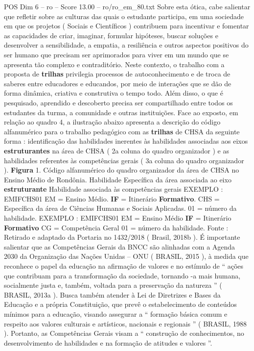 \begin{textsample}{POS Dim 6 – ro – Score 13.00 – ro/ro\_em\_80.txt}
Sobre esta ótica, cabe salientar que refletir sobre as culturas das quais o estudante participa, em uma sociedade em que os projetos ( Sociais e Científicos ) contribuem para incentivar e fomentar as capacidades de criar, imaginar, formular hipóteses, buscar soluções e desenvolver a sensibilidade, a empatia, a resiliência e outros aspectos positivos do ser humano que precisam ser aprimorados para viver em um mundo que se apresenta tão complexo e contraditório.
Neste contexto, o trabalho com a proposta de \textbf{trilhas} privilegia processos de autoconhecimento e de troca de saberes entre educadores e educandos, por meio de interações que se dão de forma dinâmica, criativa e construtiva o tempo todo.
Além disso, o que é pesquisado, aprendido e descoberto precisa ser compartilhado entre todos os estudantes da turma, a comunidade e outras instituições.
Face ao exposto, em relação ao quadro 4, a ilustração abaixo apresenta a descrição do código alfanumérico para o trabalho pedagógico com as \textbf{trilhas} de CHSA da seguinte forma : identificação das habilidades inerentes às habilidades associadas aos eixos \textbf{estruturantes} na área de CHSA ( 2a coluna do quadro organizador ) e as habilidades referentes às competências gerais ( 3a coluna do quadro organizador ). \textbf{Figura} 1.
Código alfanumérico do quadro organizador da área de CHSA no Ensino Médio de Rondônia.
Habilidade Específica da área associada ao eixo \textbf{estruturante} Habilidade associada às competências gerais EXEMPLO : EMIFCHS01 EM = Ensino Médio. \textbf{IF} = Itinerário \textbf{Formativo}.
CHS = Específica da área de Ciências Humanas e Sociais Aplicadas. 01 = número da habilidade.
EXEMPLO : EMIFCHS01 EM = Ensino Médio \textbf{IF} = Itinerário \textbf{Formativo} CG = Competência Geral 01 = número da habilidade.
Fonte : Retirado e adaptado da Portaria no 1432/2018 ( Brasil, 2018b ).
É importante salientar que as Competências Gerais da BNCC são alinhadas com a Agenda 2030 da Organização das Nações Unidas – ONU ( BRASIL, 2015 ), à medida que reconhece o papel da educação na afirmação de valores e no estímulo de “ ações que contribuam para a transformação da sociedade, tornando -a mais humana, socialmente justa e, também, voltada para a preservação da natureza ” ( BRASIL, 2013a ).
Busca também atender à Lei de Diretrizes e Bases da Educação e a própria Constituição, que prevê o estabelecimento de conteúdos mínimos para a educação, visando assegurar a “ formação básica comum e respeito aos valores culturais e artísticos, nacionais e regionais ” ( BRASIL, 1988 ).
Portanto, as Competências Gerais visam a “ construção de conhecimentos, no desenvolvimento de habilidades e na formação de atitudes e valores ”.

\end{textsample}
